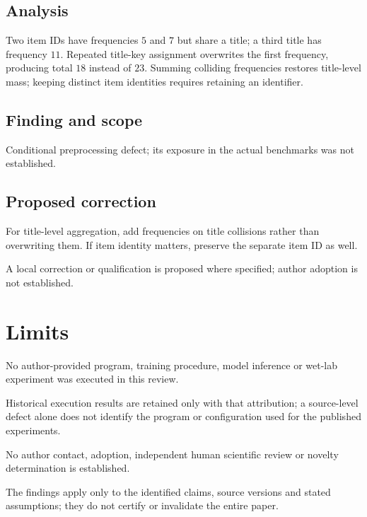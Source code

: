 \documentclass[11pt]{article}
\begin{document}
\subsection*{Analysis}

Two item IDs have frequencies \(5\) and \(7\) but share a title; a third title has frequency \(11\). Repeated title-key assignment overwrites the first frequency, producing total \(18\) instead of \(23\). Summing colliding frequencies restores title-level mass; keeping distinct item identities requires retaining an identifier.

\subsection*{Finding and scope}

Conditional preprocessing defect; its exposure in the actual benchmarks was not established.

\subsection*{Proposed correction}

For title-level aggregation, add frequencies on title collisions rather than overwriting them. If item identity matters, preserve the separate item ID as well.

A local correction or qualification is proposed where specified; author adoption is not established.

\section*{Limits}

No author-provided program, training procedure, model inference or wet-lab experiment was executed in this review.\par

Historical execution results are retained only with that attribution; a source-level defect alone does not identify the program or configuration used for the published experiments.\par

No author contact, adoption, independent human scientific review or novelty determination is established.\par

The findings apply only to the identified claims, source versions and stated assumptions; they do not certify or invalidate the entire paper.\par
\end{document}
